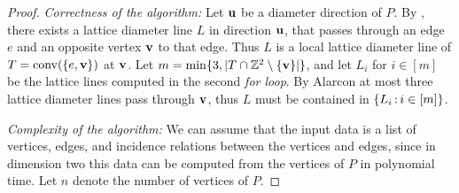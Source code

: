 \begin{proof}
    \emph{Correctness of the algorithm:} Let $\mathbf{u}$ be a diameter direction of $P$. By , there exists a lattice diameter line $L$ in direction $\mathbf{u}$, that passes through an edge $e$ and an opposite vertex $\mathbf{v}$ to that edge. Thus $L$ is a local lattice diameter line of $T=\operatorname{conv}(\{e,\mathbf{v}\})$ at $\mathbf{v}$. Let $m = \min \{3, |T \cap \mathbb{Z}^2 \setminus \{\mathbf{v}\}|\}$, and let $L_i$ for $i \in [m]$ be the lattice lines computed in the second \textit{for loop}. By Alarcon \cite[Lemma~2.4]{Alarcon_PhD} at most three lattice diameter lines pass through $\mathbf{v}$, thus $L$ must be contained in $\{L_i \, \mathrm{:}\, i \in [m]\}$.

    \emph{Complexity of the algorithm:} We can assume that the input data is a list of vertices, edges, and incidence relations between the vertices and edges, since in dimension two this data can be computed from the vertices of $P$ in polynomial time. Let $n$ denote the number of vertices of $P$.


\end{proof}
